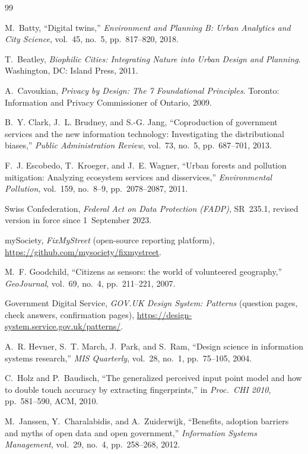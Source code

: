 \documentclass[11pt,a4paper]{article}
\begin{document}
\begin{thebibliography}{99}
\small

 M.~Batty, ``Digital twins,'' \emph{Environment and Planning B: Urban Analytics and City Science}, vol.~45, no.~5, pp.~817--820, 2018.

 T.~Beatley, \emph{Biophilic Cities: Integrating Nature into Urban Design and Planning}. Washington, DC: Island Press, 2011.

 A.~Cavoukian, \emph{Privacy by Design: The 7 Foundational Principles}. Toronto: Information and Privacy Commissioner of Ontario, 2009.

 B.~Y. Clark, J.~L. Brudney, and S.-G. Jang, ``Coproduction of government services and the new information technology: Investigating the distributional biases,'' \emph{Public Administration Review}, vol.~73, no.~5, pp.~687--701, 2013.

 F.~J. Escobedo, T.~Kroeger, and J.~E. Wagner, ``Urban forests and pollution mitigation: Analyzing ecosystem services and disservices,'' \emph{Environmental Pollution}, vol.~159, no.~8--9, pp.~2078--2087, 2011.

 Swiss Confederation, \emph{Federal Act on Data Protection (FADP)}, SR~235.1, revised version in force since 1~September 2023.

 mySociety, \emph{FixMyStreet} (open-source reporting platform), \url{https://github.com/mysociety/fixmystreet}.

 M.~F. Goodchild, ``Citizens as sensors: the world of volunteered geography,'' \emph{GeoJournal}, vol.~69, no.~4, pp.~211--221, 2007.

 Government Digital Service, \emph{GOV.UK Design System: Patterns} (question pages, check answers, confirmation pages), \url{https://design-system.service.gov.uk/patterns/}.

 A.~R. Hevner, S.~T. March, J.~Park, and S.~Ram, ``Design science in information systems research,'' \emph{MIS Quarterly}, vol.~28, no.~1, pp.~75--105, 2004.

 C.~Holz and P.~Baudisch, ``The generalized perceived input point model and how to double touch accuracy by extracting fingerprints,'' in \emph{Proc.\ CHI 2010}, pp.~581--590, ACM, 2010.

 M.~Janssen, Y.~Charalabidis, and A.~Zuiderwijk, ``Benefits, adoption barriers and myths of open data and open government,'' \emph{Information Systems Management}, vol.~29, no.~4, pp.~258--268, 2012.


\end{thebibliography}
\end{document}
